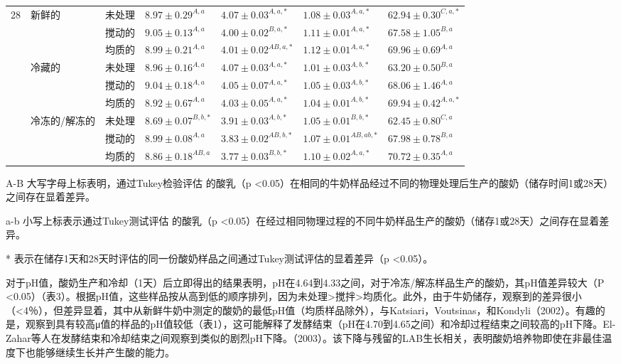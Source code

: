 \documentclass[twocolumn]{ctexart}
\begin{document}
\begin{table*}[!htb]
\begin{threeparttable}
\begin{tabular}{lllllll}
   28 & 新鲜的 & 未处理 & $8.97 \pm 0.29^{A,a}$ & $4.07 \pm 0.03^{A,a,*}$ & $1.08 \pm 0.03^{A,a,*}$ & $62.94 \pm 0.30^{C,a,*}$\\
      &        & 搅动的 & $9.05 \pm 0.13^{A,a}$ & $4.00 \pm 0.02^{B,a,*}$ & $1.11 \pm 0.01^{A,a,*}$ & $67.58 \pm 1.05^{B,a}$\\  
      &        & 均质的 & $8.99 \pm 0.21^{A,a}$ & $4.01 \pm 0.02^{AB,a,*}$ & $1.12 \pm 0.01^{A,a,*}$ & $69.96 \pm 0.69^{A,a}$\\
      & 冷藏的 & 未处理 & $8.96 \pm 0.16^{A,a}$ & $4.07 \pm 0.03^{A,a,*}$ & $1.01 \pm 0.03^{A,b,*}$ & $63.20 \pm 0.50^{B,a}$\\
      &        & 搅动的 & $9.04 \pm 0.18^{A,a}$ & $4.05 \pm 0.07^{A,a,*}$ & $1.05 \pm 0.03^{A,b,*}$ & $68.06 \pm 1.46^{A,a}$\\
      &        & 均质的 & $8.92 \pm 0.67^{A,a}$ & $4.03 \pm 0.05^{A,a,*}$ & $1.04 \pm 0.01^{A,b,*}$ & $69.94 \pm 0.42^{A,a,*}$\\
      & 冷冻的/解冻的 & 未处理 & $8.69 \pm 0.07^{B,b,*}$ & $3.91 \pm 0.03^{A,b,*}$ & $1.05 \pm 0.01^{B,b,*}$ & $62.45 \pm 0.80^{C,a}$\\
	  &               & 搅动的 & $8.99 \pm 0.08^{A,a}$ & $3.83 \pm 0.02^{AB,b,*}$ & $1.07 \pm 0.01^{AB,ab,*}$ & $67.98 \pm 0.78^{B,a}$\\
      &               & 均质的 & $8.86 \pm 0.18^{AB,a}$ & $3.77 \pm 0.03^{B,b,*}$ & $1.10 \pm 0.02^{A,a,*}$ & $70.72 \pm 0.35^{A,a}$\\
	\hline
\end{tabular}
\begin{tablenotes}
	\footnotesize
	\item[A-B] 大写字母上标表明，通过Tukey检验评估 的酸乳（p <0.05）在相同的牛奶样品经过不同的物理处理后生产的酸奶（储存时间1或28天）之间存在显着差异。
	\item[a-b] 小写上标表示通过Tukey测试评估 的酸乳（p <0.05）在经过相同物理过程的不同牛奶样品生产的酸奶（储存1或28天）之间存在显着差异。
	\item[*] 表示在储存1天和28天时评估的同一份酸奶样品之间通过Tukey测试评估的显着差异（p <0.05）。
\end{tablenotes}
\end{threeparttable}
\end{table*}

对于pH值，酸奶生产和冷却（1天）后立即得出的结果表明，pH在4.64到4.33之间，对于冷冻/解冻样品生产的酸奶，其pH值差异较大（P <0.05）（表3）。根据pH值，这些样品按从高到低的顺序排列，因为未处理>搅拌>均质化。此外，由于牛奶储存，观察到的差异很小（<4％），但差异显着，其中从新鲜牛奶中测定的酸奶的最低pH值（均质样品除外），与Katsiari，Voutsinas，和Kondyli（2002）。有趣的是，观察到具有较高μ值的样品的pH值较低（表1），这可能解释了发酵结束（pH在4.70到4.65之间）和冷却过程结束之间较高的pH下降。El-Zahar等人在发酵结束和冷却结束之间观察到类似的剧烈pH下降。（2003）。该下降与残留的LAB生长相关，表明酸奶培养物即使在非最佳温度下也能够继续生长并产生酸的能力。
\end{document}
